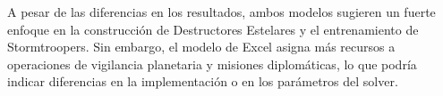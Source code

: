 \documentclass[
	spanish, %
	oneside
]{article}
\begin{document}
\noindent A pesar de las diferencias en los resultados, ambos modelos sugieren un fuerte enfoque en la construcción de Destructores Estelares y el entrenamiento de Stormtroopers. Sin embargo, el modelo de Excel asigna más recursos a operaciones de vigilancia planetaria y misiones diplomáticas, lo que podría indicar diferencias en la implementación o en los parámetros del solver.
\end{document}
